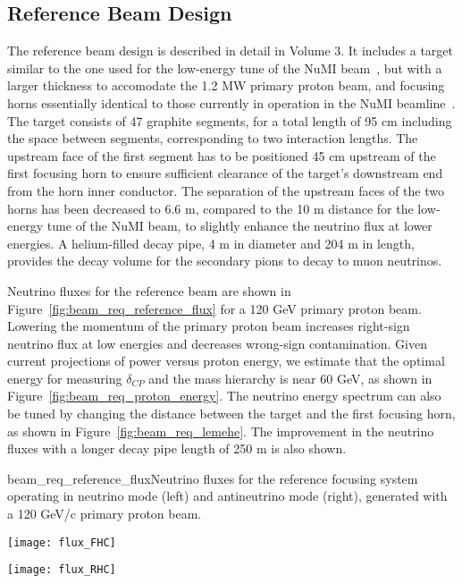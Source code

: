\subsection{Reference Beam Design}
\label{subsec:reference-design-focusing-system}
The reference beam design is described in detail in Volume 3. It
includes a target similar to the one used for the low-energy tune of
the NuMI beam~\cite{numitdr}, but with a larger thickness to accomodate the 1.2 MW primary proton beam, and focusing horns essentially identical to those currently in operation in the NuMI beamline~\cite{numitdr}. The target consists of 47 graphite segments, for a total length of 95 cm including the space between segments, corresponding to two interaction lengths. The upstream face of the first segment has to be positioned 45 cm upstream of the first focusing horn to ensure sufficient clearance of the target's downstream end from the horn inner conductor. The separation of the upstream faces of the two horns has been decreased to 6.6 m, compared to the 10 m distance for the low-energy tune of the NuMI beam, to slightly enhance the neutrino flux at lower energies. A helium-filled decay pipe, 4 m in diameter and 204 m in length, provides the decay volume for the secondary pions to decay to muon neutrinos. 

Neutrino fluxes for the reference beam are shown in
Figure~\ref{fig:beam_req_reference_flux} for a 120 GeV primary proton
beam.  Lowering the momentum of the primary proton beam increases
right-sign neutrino flux at low energies and decreases wrong-sign
contamination.  Given current projections of power versus proton
energy, we estimate that the optimal energy for measuring
$\delta_{CP}$ and the mass hierarchy is near 60 GeV, as shown in
Figure~\ref{fig:beam_req_proton_energy}.   The neutrino energy
spectrum can also be tuned by changing the distance between the target and the first focusing horn, as shown in Figure~\ref{fig:beam_req_lemehe}. The improvement in the neutrino fluxes with a longer decay pipe length of 250 m is also shown.

\begin{cdrfigure}{beam_req_reference_flux}{Neutrino fluxes for the reference 
    focusing system operating in neutrino mode (left) and antineutrino 
    mode (right), generated with a 120 GeV/c primary proton beam.} 
\centering 
\begin{minipage}{0.45\textwidth}
\centering 
\texttt{[image: flux\_FHC]}
\end{minipage}\hfill 
\begin{minipage}{0.45\textwidth}
\centering 
\texttt{[image: flux\_RHC]}
\end{minipage}
\end{cdrfigure}


